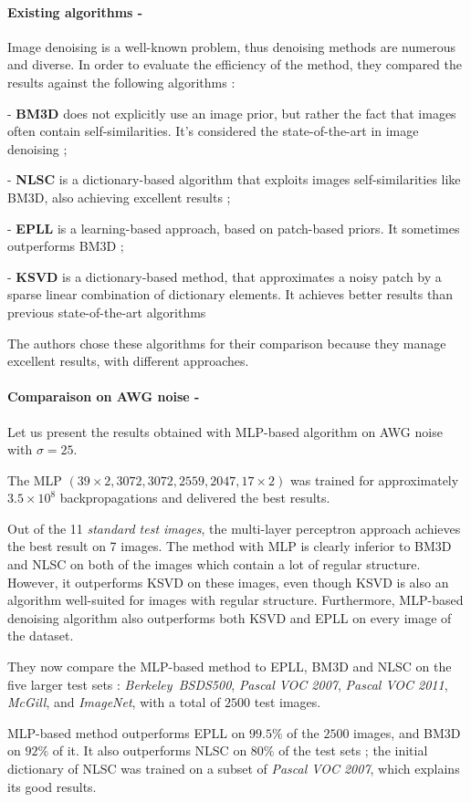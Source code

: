 \documentclass[10pt,a4paper]{article}
\newcommand{\svs}{\vspace{9pt}}
\newcommand{\ourparagraph}[1]{\paragraph{#1}}
\begin{document}
\ourparagraph{Existing algorithms -}{

Image denoising is a well-known problem, thus denoising methods are numerous and diverse. In order to evaluate the efficiency of the method, they compared the results against the following algorithms :

\svs

- \textbf{BM3D} does not explicitly use an image prior, but rather the fact that images often contain self-similarities. It's considered the state-of-the-art in image denoising ;

- \textbf{NLSC} is a dictionary-based algorithm that exploits images self-similarities like BM3D, also achieving excellent results ;

- \textbf{EPLL} is a learning-based approach, based on patch-based priors. It sometimes outperforms BM3D ;

- \textbf{KSVD} is a dictionary-based method, that approximates a noisy patch by a sparse linear combination of dictionary elements. It achieves better results than previous state-of-the-art algorithms

\svs

The authors chose these algorithms for their comparison because they manage excellent results, with different approaches.}

\ourparagraph{Comparaison on AWG noise -}{
Let us present the results obtained with MLP-based algorithm on AWG noise with $\sigma=25$.

\svs 

The MLP $(39 \times 2, 3072, 3072, 2559, 2047, 17 \times 2)$ was trained for approximately $3.5 \times 10^8$ backpropagations and delivered the best results.

\svs 

Out of the 11 \textit{standard test images}, the multi-layer perceptron approach achieves the best result on 7 images.
The method with MLP is clearly inferior to BM3D and NLSC on both of the images which contain a lot of regular structure. However, it outperforms KSVD on these images, even though KSVD is also an algorithm well-suited for images with regular structure. Furthermore, MLP-based denoising algorithm also outperforms both KSVD and EPLL on every image of the dataset.

\svs

They now compare the MLP-based method to EPLL, BM3D and NLSC on the five larger test sets : \textit{Berkeley\ BSDS500}, \textit{Pascal VOC 2007}, \textit{Pascal VOC 2011}, \textit{McGill}, and \textit{ImageNet}, with a total of $2500$ test images.

\svs

MLP-based method outperforms EPLL on $99.5\%$ of the $2500$ images, and BM3D on $92\%$ of it. It also outperforms NLSC on $80\%$ of the test sets ; the initial dictionary of NLSC was trained on a subset of \textit{Pascal VOC 2007}, which explains its good results.}
\end{document}
